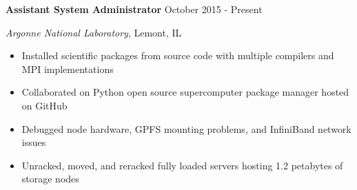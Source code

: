 

\textbf{Assistant System Administrator} \hfill October 2015 - Present

\textit{Argonne National Laboratory}, Lemont, IL

\begin{itemize}
    \item Installed scientific packages from source code with multiple compilers and MPI implementations
    \item Collaborated on Python open source supercomputer package manager hosted on GitHub
    \item Debugged node hardware, GPFS mounting problems, and InfiniBand network issues
    \item Unracked, moved, and reracked fully loaded servers hosting 1.2 petabytes of storage nodes
\end{itemize}
